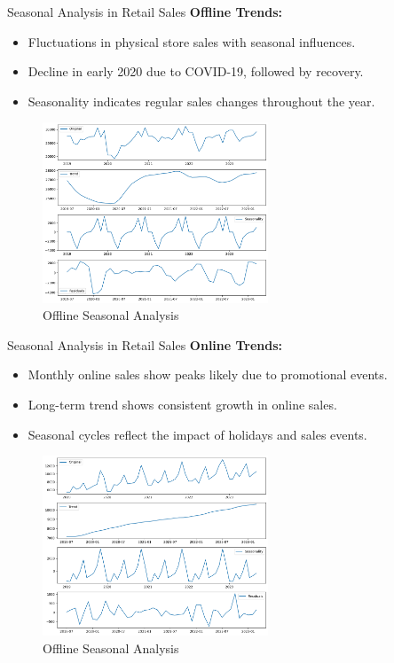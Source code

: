 \documentclass{beamer}
\begin{document}
\begin{frame}{Seasonal Analysis in Retail Sales}
\textbf{Offline Trends:}
\begin{itemize}
    \item Fluctuations in physical store sales with seasonal influences.
    \item Decline in early 2020 due to COVID-19, followed by recovery.
    \item Seasonality indicates regular sales changes throughout the year.
\end{itemize}

\begin{figure}
    \centering
    \includegraphics[width=0.6\textwidth]{Seasonal_analysis_offline.png}
    \caption{Offline Seasonal Analysis}
    \end{figure}

\end{frame}

\begin{frame}{Seasonal Analysis in Retail Sales}
\textbf{Online Trends:}
\begin{itemize}
    \item Monthly online sales show peaks likely due to promotional events.
    \item Long-term trend shows consistent growth in online sales.
    \item Seasonal cycles reflect the impact of holidays and sales events.
\end{itemize}


\begin{figure}
    \centering
    \includegraphics[width=0.6\textwidth]{Seasonal_analysis_online.png}
    \caption{Offline Seasonal Analysis}
    \end{figure}
    
\end{frame}
\end{document}

